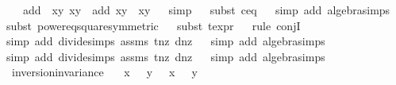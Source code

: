 \begin{isabellebody}
\ \ \ {\isachardoublequoteopen}add\ {\isacharparenleft}{\isasymtau}\ {\isacharparenleft}x{}{\isacharcomma}y{}{\isacharparenright}{\isacharparenright}\ {\isacharparenleft}x{}{\isacharcomma}y{}{\isacharparenright}\ {\isacharequal}\ add\ {\isacharparenleft}x{}{\isacharcomma}y{}{\isacharparenright}\ {\isacharparenleft}{\isasymtau}\ {\isacharparenleft}x{}{\isacharcomma}y{}{\isacharparenright}{\isacharparenright}{\isachardoublequoteclose}\isanewline
%
\isadelimproof
\ \ %
\endisadelimproof
%
\isatagproof
{}\isamarkupfalse%
{\isacharparenleft}simp{\isacharparenright}\isanewline
\ \ \isamarkupfalse%
{\isacharparenleft}subst\ c{\isacharunderscore}eq{\isacharunderscore}{}{\isacharparenright}{\isacharplus}\isanewline
\ \ \isamarkupfalse%
{\isacharparenleft}simp\ add{\isacharcolon}\ algebra{\isacharunderscore}simps{\isacharparenright}\isanewline
\ \ \isamarkupfalse%
{\isacharparenleft}subst\ power{}{\isacharunderscore}eq{\isacharunderscore}square{\isacharbrackleft}symmetric{\isacharbrackright}{\isacharparenright}{\isacharplus}\isanewline
\ \ \isamarkupfalse%
{\isacharparenleft}subst\ t{\isacharunderscore}expr{\isacharparenright}{\isacharplus}\isanewline
\ \ \isamarkupfalse%
{\isacharparenleft}rule\ conjI{\isacharparenright}\isanewline
\ \ \isamarkupfalse%
{\isacharparenleft}simp\ add{\isacharcolon}\ divide{\isacharunderscore}simps\ assms\ t{\isacharunderscore}nz\ d{\isacharunderscore}nz{\isacharparenright}\isanewline
\ \ \isamarkupfalse%
{\isacharparenleft}simp\ add{\isacharcolon}\ algebra{\isacharunderscore}simps{\isacharparenright}\isanewline
\ \ \isamarkupfalse%
{\isacharparenleft}simp\ add{\isacharcolon}\ divide{\isacharunderscore}simps\ assms\ t{\isacharunderscore}nz\ d{\isacharunderscore}nz{\isacharparenright}\isanewline
\ \ \isamarkupfalse%
{\isacharparenleft}simp\ add{\isacharcolon}\ algebra{\isacharunderscore}simps{\isacharparenright}%
\endisatagproof
{\isafoldproof}%
%
\isadelimproof
\isanewline
%
\endisadelimproof
\isanewline
{}\isamarkupfalse%
\ inversion{\isacharunderscore}invariance{\isacharunderscore}{}{\isacharcolon}\isanewline
\ \ \ {\isachardoublequoteopen}x{}\ {\isasymnoteq}\ {}{\isachardoublequoteclose}\ {\isachardoublequoteopen}y{}\ {\isasymnoteq}\ {}{\isachardoublequoteclose}\ {\isachardoublequoteopen}x{}\ {\isasymnoteq}\ {}{\isachardoublequoteclose}\ {\isachardoublequoteopen}y{}\ {\isasymnoteq}\ {}{\isachardoublequoteclose}\ \isanewline

\end{isabellebody}
